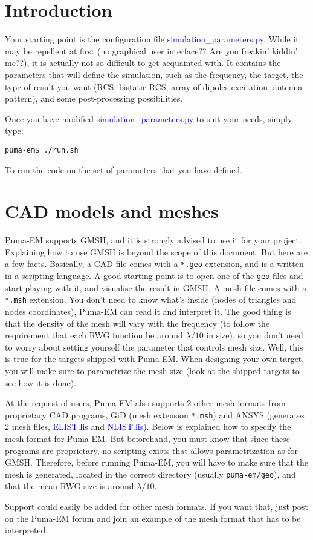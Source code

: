\documentclass[a4paper,10pt]{book}
\newcommand{\file}[1] {\textcolor{blue}{\textsf{#1}}}
\begin{document}
\section{Introduction}
%
\par
Your starting point is the configuration file \file{simulation\_parameters.py}. While it may be repellent at first (no graphical user interface?? Are you freakin' kiddin' me??), it is actually not so difficult to get acquainted with. It contains the parameters that will define the simulation, such as the frequency, the target, the type of result you want (RCS, bistatic RCS, array of dipoles excitation, antenna pattern), and some post-processing possibilities. 
%
\par
Once you have modified \file{simulation\_parameters.py} to suit your needs, simply type:
\begin{verbatim}
puma-em$ ./run.sh
\end{verbatim}
To run the code on the set of parameters that you have defined.

\section{CAD models and meshes}
%
\par
Puma-EM supports GMSH, and it is strongly advised to use it for your project. Explaining how to use GMSH is beyond the scope of this document. But here are a few facts. Basically, a CAD file comes with a \texttt{*.geo} extension, and is a written in a scripting language. A good starting point is to open one of the \texttt{geo} files and start playing with it, and visualise the result in GMSH. A mesh file comes with a \texttt{*.msh} extension. You don't need to know what's inside (nodes of triangles and nodes coordinates), Puma-EM can read it and interpret it. The good thing is that the density of the mesh will vary with the frequency (to follow the requirement that each RWG function be around $\lambda/10$ in size), so you don't need to worry about setting yourself the parameter that controls mesh size. Well, this is true for the targets shipped with Puma-EM. When designing your own target, you will make sure to parametrize the mesh size (look at the shipped targets to see how it is done).
%
\par
At the request of users, Puma-EM also supports 2 other mesh formats from proprietary CAD programs, GiD (mesh extension \texttt{*.msh}) and ANSYS (generates 2 mesh files, \file{ELIST.lis} and \file{NLIST.lis}). Below is explained how to specify the mesh format for Puma-EM. But beforehand, you must know that since these programs are proprietary, no scripting exists that allows parametrization as for GMSH. Therefore, before running Puma-EM, you will have to make sure that the mesh is generated, located in the correct directory (usually \texttt{puma-em/geo}), and that the mean RWG size is around $\lambda/10$.
%
\par
Support could easily be added for other mesh formats. If you want that, just post on the Puma-EM forum and join an example of the mesh format that has to be interpreted.
\end{document}
